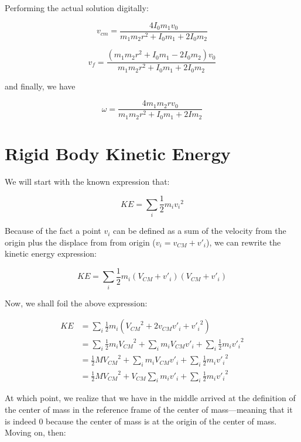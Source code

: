 \documentclass[letterpaper]{article}
\begin{document}
Performing the actual solution digitally:

\begin{equation}
   v_{cm} = \frac{4I_0m_1v_0}{m_1m_2r^2+I_0m_1+2I_0m_2} 
\end{equation}

\begin{equation}
   v_f = \frac{(m_1m_2r^2 + I_0m_1 - 2I_0m_2)v_0}{m_1m_2r^2 + I_0m_1+2I_0m_2} 
\end{equation}

and finally, we have

\begin{equation}
   \omega = \frac{4m_1m_2rv_0}{m_1m_2r^2+I_0m_1+2Im_2} 
\end{equation}

\section{Rigid Body Kinetic Energy}
\label{sec:orgaa34344}
We will start with the known expression that:

\begin{equation}
   KE = \sum_i \frac{1}{2} m_i{v_i}^2
\end{equation}

Because of the fact a point \(v_i\) can be defined as a sum of the velocity from the origin plus the displace from from origin (\(v_i = v_{CM}+v'_i\)), we can rewrite the kinetic energy expression:

\begin{equation}
   KE = \sum_i  \frac{1}{2}  m_i (V_{CM}+v'_i)(V_{CM}+v'_i)
\end{equation}

Now, we shall foil the above expression:

\begin{align}
   KE &= \sum_i  \frac{1}{2}  m_i ({V_{CM}}^2+2v_{CM}v'_i+{v'_i}^2) \\
&= \sum_i  \frac{1}{2}  m_i {V_{CM}}^2+ \sum_i  m_i V_{CM}v'_i+\sum_i  \frac{1}{2}  m_i {v'_i}^2 \\
&= \frac{1}{2}  M {V_{CM}}^2+ \sum_i  m_i V_{CM}v'_i+\sum_i  \frac{1}{2} m_i {v'_i}^2 \\
&= \frac{1}{2}  M {V_{CM}}^2+ V_{CM}\sum_i  m_i v'_i+\sum_i  \frac{1}{2} m_i {v'_i}^2 
\end{align}

At which point, we realize that we have in the middle arrived at the definition of the center of mass in the reference frame of the center of mass---meaning that it is indeed \(0\) because the center of mass is at the origin of the center of mass. Moving on, then:
\end{document}
